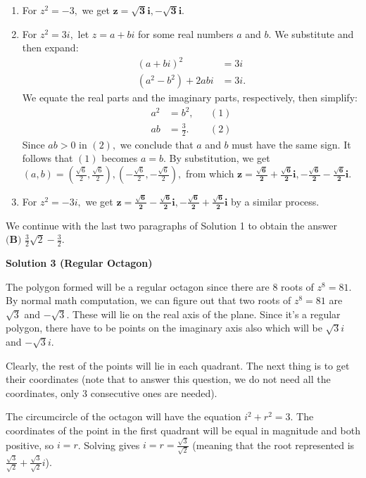\begin{enumerate}
\begin{enumerate}
        \item For $z^2=-3,$ we get $\boldsymbol{z=\sqrt3i,-\sqrt3i}.$

        \item For $z^2=3i,$ let $z=a+bi$ for some real numbers $a$ and $b.$ We substitute and then expand:
 \begin{align*} (a+bi)^2 &= 3i \\ \left(a^2-b^2\right)+2abi &= 3i. \end{align*}
We equate the real parts and the imaginary parts, respectively, then simplify:
 \begin{align*} a^2 &= b^2, &&(1) \\ ab &= \frac32. &&(2) \end{align*}
Since $ab>0$ in $(2),$ we conclude that $a$ and $b$ must have the same sign. It follows that $(1)$ becomes $a=b.$ By substitution, we get $(a,b)=\left(\frac{\sqrt6}{2},\frac{\sqrt6}{2}\right),\left(-\frac{\sqrt6}{2},-\frac{\sqrt6}{2}\right),$ from which $\boldsymbol{z=\frac{\sqrt6}{2}+\frac{\sqrt6}{2}i,-\frac{\sqrt6}{2}-\frac{\sqrt6}{2}i}.$

        \item For $z^2=-3i,$ we get $\boldsymbol{z=\frac{\sqrt6}{2}-\frac{\sqrt6}{2}i,-\frac{\sqrt6}{2}+\frac{\sqrt6}{2}i}$ by a similar process.

            \end{enumerate}
            We continue with the last two paragraphs of Solution 1 to obtain the answer $\boxed{\textbf{(B) } \frac{3}{2}\sqrt{2}-\frac{3}{2}}.$




\textbf{Solution 3 (Regular Octagon)}

The polygon formed will be a regular octagon since there are $8$ roots of $z^8=81$. By normal math computation, we can figure out that two roots of $z^8=81$ are $\sqrt{3}$ and $-\sqrt{3}$. These will lie on the real axis of the plane. Since it's a regular polygon, there have to be points on the imaginary axis also which will be $\sqrt{3}i$ and $-\sqrt{3}i$.

 Clearly, the rest of the points will lie in each quadrant. The next thing is to get their coordinates (note that to answer this question, we do not need all the coordinates, only 3 consecutive ones are needed).

 The circumcircle of the octagon will have the equation $i^2+r^2=3$. The coordinates of the point in the first quadrant will be equal in magnitude and both positive, so $i=r$. Solving gives $i=r=\frac{\sqrt{3}}{\sqrt{2}}$ (meaning that the root represented is $\frac{\sqrt{3}}{\sqrt{2}}+\frac{\sqrt{3}}{\sqrt{2}}i$).


\end{enumerate}
